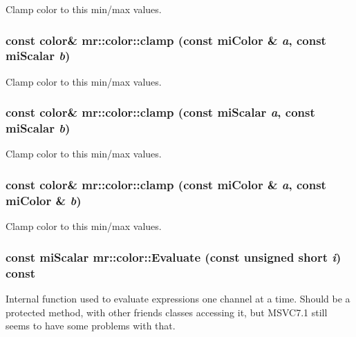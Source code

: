 Clamp color to this min/max values. 

\subsubsection{\setlength{\rightskip}{0pt plus 5cm}const {\bf color}\& mr::color::clamp (const mi\-Color \& {\em a}, const mi\-Scalar {\em b})\hspace{0.3cm}{\tt  [inline]}}\label{structmr_1_1color_z15_4}


Clamp color to this min/max values. 

\subsubsection{\setlength{\rightskip}{0pt plus 5cm}const {\bf color}\& mr::color::clamp (const mi\-Scalar {\em a}, const mi\-Scalar {\em b})\hspace{0.3cm}{\tt  [inline]}}\label{structmr_1_1color_z15_3}


Clamp color to this min/max values. 

\subsubsection{\setlength{\rightskip}{0pt plus 5cm}const {\bf color}\& mr::color::clamp (const mi\-Color \& {\em a}, const mi\-Color \& {\em b})\hspace{0.3cm}{\tt  [inline]}}\label{structmr_1_1color_z15_2}


Clamp color to this min/max values. 

\subsubsection{\setlength{\rightskip}{0pt plus 5cm}const mi\-Scalar mr::color::Evaluate (const unsigned short {\em i}) const\hspace{0.3cm}{\tt  [inline]}}\label{structmr_1_1color_a0}


Internal function used to evaluate expressions one channel at a time. Should be a protected method, with other friends classes accessing it, but MSVC7.1 still seems to have some problems with that. 
